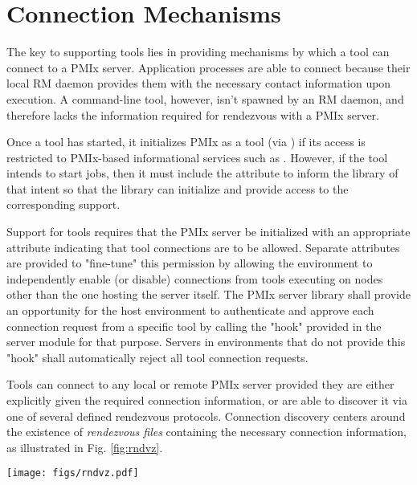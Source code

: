 \section{Connection Mechanisms}
\label{chap:api_tools:cnct}

The key to supporting tools lies in providing mechanisms by which a tool can connect to a \ac{PMIx} server. Application processes are able to connect because their local \ac{RM} daemon provides them with the necessary contact information upon execution. A command-line tool, however, isn't spawned by an \ac{RM} daemon, and therefore lacks the information required for rendezvous with a \ac{PMIx} server.

Once a tool has started, it initializes \ac{PMIx} as a tool (via ) if its access is restricted to \ac{PMIx}-based informational services such as . However, if the tool intends to start jobs, then it must include the  attribute to inform the library of that intent so that the library can initialize and provide access to the corresponding support.

Support for tools requires that the \ac{PMIx} server be initialized with an appropriate attribute indicating that tool connections are to be allowed. Separate attributes are provided to "fine-tune" this permission by allowing the environment to independently enable (or disable) connections from tools executing on nodes other than the one hosting the server itself. The \ac{PMIx} server library shall provide an opportunity for the host environment to authenticate and approve each connection request from a specific tool by calling the  "hook" provided in the server module for that purpose. Servers in environments that do not provide this "hook" shall automatically reject all tool connection requests.

Tools can connect to any local or remote \ac{PMIx} server provided they are either explicitly given the required connection information, or are able to discover it via one of several defined rendezvous protocols. Connection discovery centers around the existence of \emph{rendezvous files} containing the necessary connection information, as illustrated in Fig. \ref{fig:rndvz}.

\begingroup
\begin{figure*}[ht!]
  \begin{center}
    \texttt{[image: figs/rndvz.pdf]}
  \end{center}
  \caption{Tool rendezvous files}
  \label{fig:rndvz}
\end{figure*}
\endgroup

